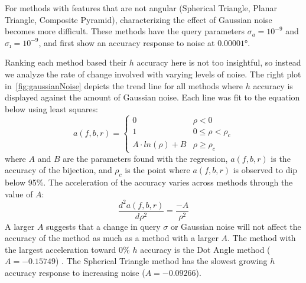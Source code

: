 For methods with features that are not angular (Spherical Triangle, Planar Triangle, Composite Pyramid),
characterizing the effect of Gaussian noise becomes more difficult.
These methods have the query parameters $\sigma_a = 10^{-9}$ and $\sigma_\imath = 10^{-9}$, and first show an
accuracy response to noise at $\ang{0.00001}$.

Ranking each method based their $h$ accuracy here is not too insightful, so instead we analyze the rate of change
involved with varying levels of noise.
The right plot in~\autoref{fig:gaussianNoise} depicts the trend line for all methods where $h$ accuracy is displayed
against the amount of Gaussian noise.
Each line was fit to the equation below using least squares:
\begin{equation}
    a(f, b, r) =
    \begin{cases}
        0 & \rho < 0 \\
        1 & 0 \leq \rho < \rho_c \\
        A \cdot \mathit{ln}(\rho) + B & \rho \geq \rho_c
    \end{cases}
\end{equation}
where $A$ and $B$ are the parameters found with the regression, $a(f, b, r)$ is the accuracy of the bijection, and
$\rho_c$ is the point where $a(f, b, r)$ is observed to dip below 95\%.
The acceleration of the accuracy varies across methods through the value of $A$:
\begin{equation}
    \frac{d^{2}a(f, b, r)}{d\rho^2} = \frac{-A}{\rho^2}
\end{equation}
A larger $A$ suggests that a change in query $\sigma$ or Gaussian noise will not affect the accuracy of the method
as much as a method with a larger $A$.
The method with the largest acceleration toward $0\%$ $h$ accuracy is the Dot Angle method ($A = -0.15749$) .
The Spherical Triangle method has the slowest growing $h$ accuracy response to increasing noise ($A = -0.09266$).

\begin{figure*}
\end{figure*}

